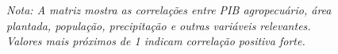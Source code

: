 \documentclass[
	12pt,				%
	oneside,			%
	a4paper,			%
	english,			%
	french,				%
	spanish,			%
	brazil				%
	]{abntex2}
\begin{document}
\begin{apendicesenv}
\begin{figure}[h]
\textit{Nota: A matriz mostra as correlações entre PIB agropecuário, área plantada, população, precipitação e outras variáveis relevantes. Valores mais próximos de 1 indicam correlação positiva forte.}
\end{figure}


\end{apendicesenv}

\printindex
\end{document}
